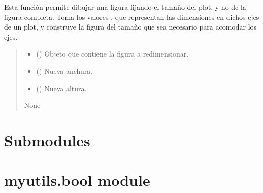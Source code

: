 \documentclass[letterpaper,10pt,english]{sphinxmanual}
\begin{document}

\begin{fulllineitems}
\label{\detokenize{myutils:myutils.set_size_plt}}
\pysigstartsignatures
{}
\pysigstopsignatures
\sphinxAtStartPar
Esta función permite dibujar una figura fijando el tamaño del plot, y no de la figura completa. Toma los valores ,  que representan las dimensiones en dichos ejes de un plot, y construye la figura del tamaño que sea necesario para acomodar los ejes.
\begin{quote}\begin{description}
\begin{itemize}
\item {} 
\sphinxAtStartPar
{} () \textendash{} Objeto que contiene la figura a redimensionar.

\item {} 
\sphinxAtStartPar
{} () \textendash{} Nueva anchura.

\item {} 
\sphinxAtStartPar
{} () \textendash{} Nueva altura.

\end{itemize}

\sphinxAtStartPar
None

\end{description}\end{quote}

\end{fulllineitems}



\section{Submodules}
\label{\detokenize{myutils:submodules}}

\section{myutils.bool module}
\label{\detokenize{myutils:module-myutils.bool}}\label{\detokenize{myutils:myutils-bool-module}}
\end{document}
